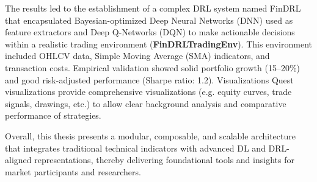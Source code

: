 The results led to the establishment of a complex DRL system named FinDRL that encapsulated Bayesian-optimized Deep Neural Networks (DNN) used as feature extractors and Deep Q-Networks (DQN) to make actionable decisions within a realistic trading environment (\textbf{FinDRLTradingEnv}). This environment included OHLCV data, Simple Moving Average (SMA) indicators, and transaction costs. Empirical validation showed solid portfolio growth (15–20\%) and good risk-adjusted performance (Sharpe ratio: 1.2). Visualizations Quest visualizations provide comprehensive visualizations (e.g. equity curves, trade signals, drawings, etc.) to allow clear background analysis and comparative performance of strategies.

Overall, this thesis presents a modular, composable, and scalable architecture that integrates traditional technical indicators with advanced DL and DRL-aligned representations, thereby delivering foundational tools and insights for market participants and researchers.